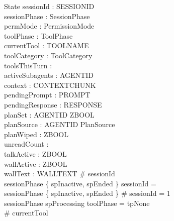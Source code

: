 \documentclass[a4paper,10pt,fleqn]{article}
\begin{document}
\begin{schema}{State}
  sessionId : \finset SESSIONID \\
  sessionPhase : SessionPhase \\
  permMode : PermissionMode \\
  toolPhase : ToolPhase \\
  currentTool : \finset TOOLNAME \\
  toolCategory : ToolCategory \\
  toolsThisTurn : \nat \\
  activeSubagents : \finset AGENTID \\
  context : \seq CONTEXTCHUNK \\
  pendingPrompt : \finset PROMPT \\
  pendingResponse : \finset RESPONSE \\
  planSet : AGENTID \pfun ZBOOL \\
  planSource : AGENTID \pfun PlanSource \\
  planWiped : ZBOOL \\
  unreadCount : \nat \\
  talkActive : ZBOOL \\
  wallActive : ZBOOL \\
  wallText : \finset WALLTEXT
  \where
  \# sessionId  \\
  sessionPhase \in \{ spInactive, spEnded \} \implies sessionId = \emptyset \\
  sessionPhase \notin \{ spInactive, spEnded \} \implies \# sessionId = 1 \\
  sessionPhase \neq spProcessing \implies toolPhase = tpNone \\
  \# currentTool  \\

\end{schema}
\end{document}
